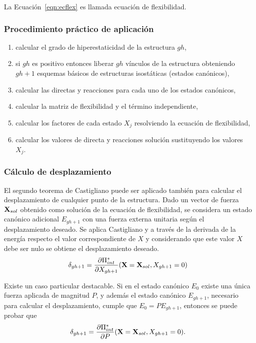 La Ecuación~\eqref{eqn:ecflex} es llamada ecuación de flexibilidad.
	
\subsubsection{Procedimiento práctico de aplicación}

\begin{enumerate}
\item calcular el grado de hiperestaticidad de la estructura $gh$,
\item si $gh$ es positivo entonces liberar $gh$ vínculos de la estructura obteniendo $gh+1$ esquemas básicos de estructuras isostáticas (estados canónicos),
\item calcular las directas y reacciones para cada uno de los estados canónicos,
\item calcular la matriz de flexibilidad y el término independiente,
\item calcular los factores de cada estado $X_j$ resolviendo la ecuación de flexibilidad,
\item calcular los valores de directa y reacciones solución sustituyendo los valores $X_j$.
\end{enumerate}


\subsubsection{Cálculo de desplazamiento}

El segundo teorema de Castigliano puede ser aplicado también para calcular el desplazamiento de cualquier punto de la estructura. %
%
Dado un vector de fuerza ${\bf X}_{sol}$ obtenido como solución de la ecuación de flexibilidad, se considera un estado canónico adicional $E_{gh+1}$ con una fuerza externa unitaria según el desplazamiento deseado. %
%
Se aplica Castigliano y a través de la derivada de la energía respecto el valor correspondiente de $X$ y considerando que este valor $X$ debe ser nulo se obtiene el desplazamiento deseado. %
%
\begin{equation}
\delta_{gh+1} = \frac{\partial \Pi^*_{int}}  { \partial X_{gh+1} } ({\bf X} = {\bf X}_{sol}, X_{gh+1}=0)
\end{equation}

Existe un caso particular destacable. %
%
Si en el estado canónico $E_0$ existe una única fuerza aplicada de magnitud $P$, y además el estado canónico $E_{gh+1}$, necesario para calcular el desplazamiento, cumple que $E_0 = P E_{gh+1}$, entonces se puede probar que %
%
\begin{equation}
\delta_{gh+1} = \frac{\partial \Pi^*_{int}}  { \partial P } ({\bf X} = {\bf X}_{sol}, X_{gh+1}=0).
\end{equation}
%



